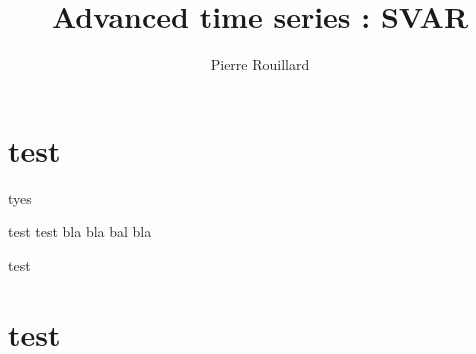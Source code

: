 \documentclass[letterpaper,12pt,leqno]{article}
\begin{document}
\title{Advanced time series : SVAR}
\author{Pierre Rouillard}
\date{}

\begin{titlepage}
\maketitle
\tableofcontents
\end{titlepage}

\section{test}\label{sec:lec1}
\begin{definition}
    tyes
\end{definition}

\begin{boxH}
    \begin{theorem}
        test test bla bla bal bla 
    \end{theorem}
\end{boxH}

\begin{proposition}
    test
\end{proposition}

\section{test}\label{sec:lec2}
\end{document}

